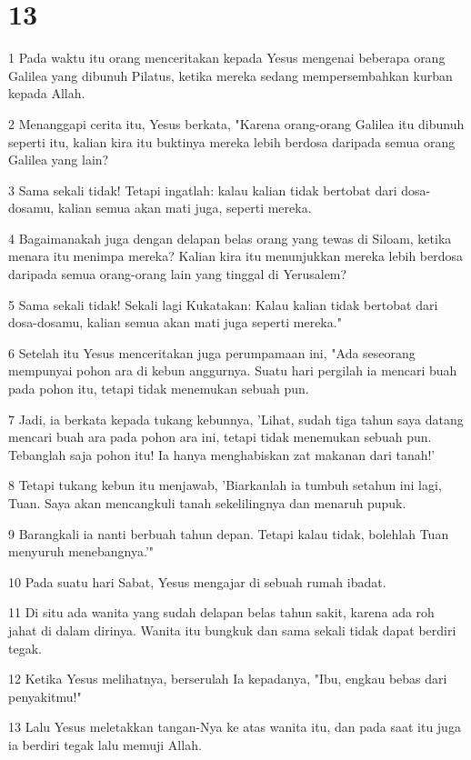 \chapter{13}

\par 1 Pada waktu itu orang menceritakan kepada Yesus mengenai beberapa orang Galilea yang dibunuh Pilatus, ketika mereka sedang mempersembahkan kurban kepada Allah.
\par 2 Menanggapi cerita itu, Yesus berkata, "Karena orang-orang Galilea itu dibunuh seperti itu, kalian kira itu buktinya mereka lebih berdosa daripada semua orang Galilea yang lain?
\par 3 Sama sekali tidak! Tetapi ingatlah: kalau kalian tidak bertobat dari dosa-dosamu, kalian semua akan mati juga, seperti mereka.
\par 4 Bagaimanakah juga dengan delapan belas orang yang tewas di Siloam, ketika menara itu menimpa mereka? Kalian kira itu menunjukkan mereka lebih berdosa daripada semua orang-orang lain yang tinggal di Yerusalem?
\par 5 Sama sekali tidak! Sekali lagi Kukatakan: Kalau kalian tidak bertobat dari dosa-dosamu, kalian semua akan mati juga seperti mereka."
\par 6 Setelah itu Yesus menceritakan juga perumpamaan ini, "Ada seseorang mempunyai pohon ara di kebun anggurnya. Suatu hari pergilah ia mencari buah pada pohon itu, tetapi tidak menemukan sebuah pun.
\par 7 Jadi, ia berkata kepada tukang kebunnya, 'Lihat, sudah tiga tahun saya datang mencari buah ara pada pohon ara ini, tetapi tidak menemukan sebuah pun. Tebanglah saja pohon itu! Ia hanya menghabiskan zat makanan dari tanah!'
\par 8 Tetapi tukang kebun itu menjawab, 'Biarkanlah ia tumbuh setahun ini lagi, Tuan. Saya akan mencangkuli tanah sekelilingnya dan menaruh pupuk.
\par 9 Barangkali ia nanti berbuah tahun depan. Tetapi kalau tidak, bolehlah Tuan menyuruh menebangnya.'"
\par 10 Pada suatu hari Sabat, Yesus mengajar di sebuah rumah ibadat.
\par 11 Di situ ada wanita yang sudah delapan belas tahun sakit, karena ada roh jahat di dalam dirinya. Wanita itu bungkuk dan sama sekali tidak dapat berdiri tegak.
\par 12 Ketika Yesus melihatnya, berserulah Ia kepadanya, "Ibu, engkau bebas dari penyakitmu!"
\par 13 Lalu Yesus meletakkan tangan-Nya ke atas wanita itu, dan pada saat itu juga ia berdiri tegak lalu memuji Allah.
